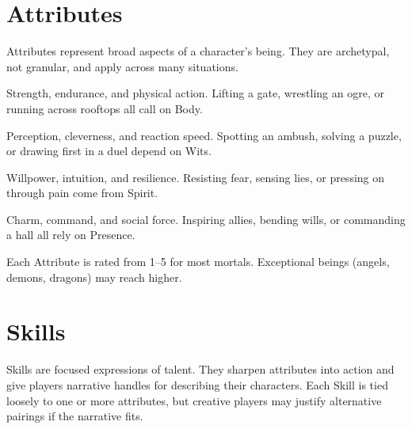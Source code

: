 \documentclass[12pt]{book}
\begin{document}
\section{Attributes}
Attributes represent broad aspects of a character’s being. They are archetypal, not granular, and apply across many situations.  

\begin{description}[leftmargin=2cm]
  \item[Body] Strength, endurance, and physical action. Lifting a gate, wrestling an ogre, or running across rooftops all call on Body.  
  \item[Wits] Perception, cleverness, and reaction speed. Spotting an ambush, solving a puzzle, or drawing first in a duel depend on Wits.  
  \item[Spirit] Willpower, intuition, and resilience. Resisting fear, sensing lies, or pressing on through pain come from Spirit.  
  \item[Presence] Charm, command, and social force. Inspiring allies, bending wills, or commanding a hall all rely on Presence.  
\end{description}

Each Attribute is rated from 1–5 for most mortals. Exceptional beings (angels, demons, dragons) may reach higher.  

\section{Skills}
Skills are focused expressions of talent. They sharpen attributes into action and give players narrative handles for describing their characters. Each Skill is tied loosely to one or more attributes, but creative players may justify alternative pairings if the narrative fits.
\end{document}
